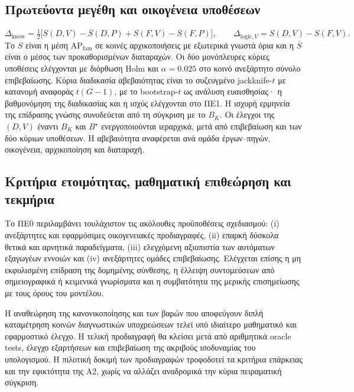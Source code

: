 \documentclass[11pt,a4paper]{article}
\begin{document}
\subsection{Πρωτεύοντα μεγέθη και οικογένεια υποθέσεων}
\[
\Delta_{\mathrm{know}}=\tfrac12\bigl[S(D,V)-\overline S(D,P)+S(F,V)-\overline S(F,P)\bigr],
\qquad
\Delta_{\mathrm{logic},V}=S(D,V)-S(F,V).
\]
Το $S$ είναι η μέση $\mathrm{AP}_{\mathrm{fam}}$ σε κοινές αρχικοποιήσεις με εξωτερικά γνωστά όρια και η $\overline S$ είναι ο μέσος των προκαθορισμένων διαταραχών. Οι δύο μονόπλευρες κύριες υποθέσεις ελέγχονται με διόρθωση Holm και $\alpha=0.025$ στο κοινό ανεξάρτητο σύνολο επιβεβαίωσης. Κύρια διαδικασία αβεβαιότητας είναι το συζευγμένο jackknife-$t$ με κατανομή αναφοράς $t(G-1)$, με το bootstrap-$t$ ως ανάλυση ευαισθησίας· η βαθμονόμηση της διαδικασίας και η ισχύς ελέγχονται στο ΠΕ1. Η ισχυρή ερμηνεία της επίδρασης γνώσης συνοδεύεται από τη σύγκριση με το $B_K$. Οι έλεγχοι της $(D,V)$ έναντι $B_K$ και $B^\star$ ενεργοποιούνται ιεραρχικά, μετά από επιβεβαίωση και των δύο κύριων υποθέσεων. Η αβεβαιότητα αναφέρεται ανά ομάδα έργων--πηγών, οικογένεια, αρχικοποίηση και διαταραχή.

\subsection{Κριτήρια ετοιμότητας, μαθηματική επιθεώρηση και τεκμήρια}
Το ΠΕ0 περιλαμβάνει τουλάχιστον τις ακόλουθες προϋποθέσεις σχεδιασμού: (i) ανεξάρτητες και εφαρμόσιμες οικογενειακές προδιαγραφές, (ii) επαρκή δύσκολα θετικά και αρνητικά παραδείγματα, (iii) ελεγχόμενη αξιοπιστία των αυτόματων εξαγωγέων εννοιών και (iv) ανεξάρτητες ομάδες επιβεβαίωσης. Ελέγχεται επίσης η μη εκφυλισμένη επίδραση της δομημένης σύνθεσης, η έλλειψη συντομεύσεων από σημειογραφικά ή κειμενικά γνωρίσματα και η συμβατότητα της μερικής επισημείωσης με τους όρους του μοντέλου.

Η αναθεώρηση της κανονικοποίησης και των βαρών που αποφεύγουν διπλή καταμέτρηση κοινών διαγνωστικών υποχρεώσεων τελεί υπό ιδιαίτερο μαθηματικό και εφαρμοστικό έλεγχο. Η τελική προδιαγραφή θα κλείσει μετά από αριθμητικά oracle tests, έλεγχο εξαρτήσεων και επιβεβαίωση της ακριβούς ισοδυναμίας του υπολογισμού. Η πιλοτική δοκιμή των προδιαγραφών τροφοδοτεί τα κριτήρια επάρκειας και την εφικτότητα της Α2, χωρίς να αλλάζει αναδρομικά την κύρια πειραματική σύγκριση.


\end{document}
